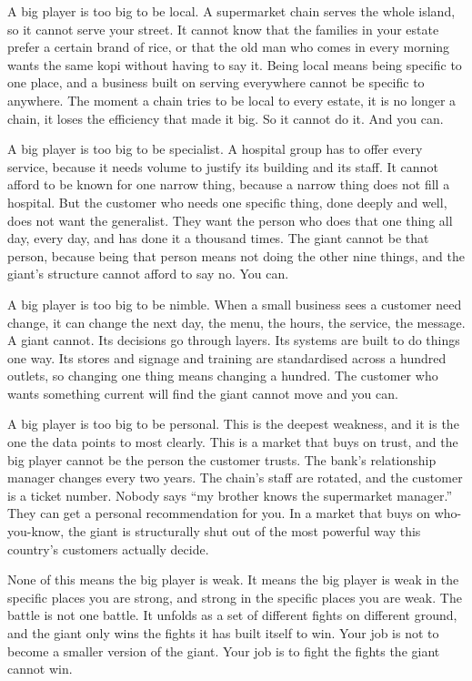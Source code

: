 \documentclass[10pt,twoside,openany]{memoir}
\begin{document}
{A big player is too big to be local. A supermarket chain serves the
whole island, so it cannot serve your street. It cannot know that the
families in your estate prefer a certain brand of rice, or that the old
man who comes in every morning wants the same kopi without having to say
it. Being local means being specific to one place, and a business built
on serving everywhere cannot be specific to anywhere. The moment a chain
tries to be local to every estate, it is no longer a chain, it loses the
efficiency that made it big. So it cannot do it. And you can.

A big player is too big to be specialist. A hospital group has to offer
every service, because it needs volume to justify its building and its
staff. It cannot afford to be known for one narrow thing, because a
narrow thing does not fill a hospital. But the customer who needs one
specific thing, done deeply and well, does not want the generalist. They
want the person who does that one thing all day, every day, and has done
it a thousand times. The giant cannot be that person, because being that
person means not doing the other nine things, and the giant's structure
cannot afford to say no. You can.

A big player is too big to be nimble. When a small business sees a
customer need change, it can change the next day, the menu, the hours,
the service, the message. A giant cannot. Its decisions go through
layers. Its systems are built to do things one way. Its stores and
signage and training are standardised across a hundred outlets, so
changing one thing means changing a hundred. The customer who wants
something current will find the giant cannot move and you can.

A big player is too big to be personal. This is the deepest weakness,
and it is the one the data points to most clearly. This is a market that
buys on trust, and the big player cannot be the person the customer
trusts. The bank's relationship manager changes every two years. The
chain's staff are rotated, and the customer is a ticket number. Nobody
says ``my brother knows the supermarket manager.'' They can get a
personal recommendation for you. In a market that buys on who-you-know,
the giant is structurally shut out of the most powerful way this
country's customers actually decide.

None of this means the big player is weak. It means the big player is
weak in the specific places you are strong, and strong in the specific
places you are weak. The battle is not one battle. It unfolds as a set
of different fights on different ground, and the giant only wins the
fights it has built itself to win. Your job is not to become a smaller
version of the giant. Your job is to fight the fights the giant cannot
win.

}
\end{document}
